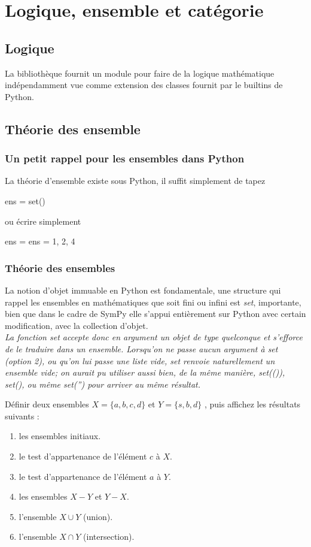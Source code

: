\part{Logique, ensemble et catégorie}
\chapter{Logique}
La bibliothèque fournit un module pour faire de la logique mathématique indépendamment vue comme extension
des classes fournit par le builtins de Python.
\chapter{Théorie des ensemble}
\section{Un petit rappel pour les ensembles dans Python}
La théorie d'ensemble existe sous Python, il suffit simplement de tapez 
\begin{python}
ens = set()
\end{python}
ou écrire simplement 
\begin{python}
 ens = ens = {1, 2, 4}
\end{python}
\section{Théorie des ensembles}
La notion d'objet immuable en Python est fondamentale,  une structure qui rappel les ensembles en mathématiques que soit fini ou infini est \textit{set}, importante, bien que dans le cadre de SymPy elle s'appui entièrement sur Python avec certain modification, avec la collection d'objet.
\\

\textit{La fonction set accepte donc en argument un objet de type quelconque et s'efforce de le traduire dans un ensemble. Lorsqu'on ne passe aucun argument à set (option 2), ou qu'on lui passe une liste vide, set renvoie naturellement un ensemble vide; on aurait pu utiliser aussi bien, de la même manière, set(()), set({}), ou même set('') pour arriver au même résultat.}

\begin{exercise}
		Définir deux ensembles $X = \lbrace a, b, c, d\rbrace$ et  $Y = \lbrace s, b, d\rbrace$ , puis 			affichez les résultats suivants :
 		\begin{enumerate}
  			 \item les ensembles initiaux.
  			 \item le test d’appartenance de l’élément $c$ à $X$.
  			 \item le test d’appartenance de l’élément $a$ à $Y$.
  			 \item les ensembles $X - Y$ et $Y - X$.
  			 \item l’ensemble $X \cup Y$ (union).
  			 \item l'ensemble $X \cap Y$ (intersection).
	 \end{enumerate}
\end{exercise}


